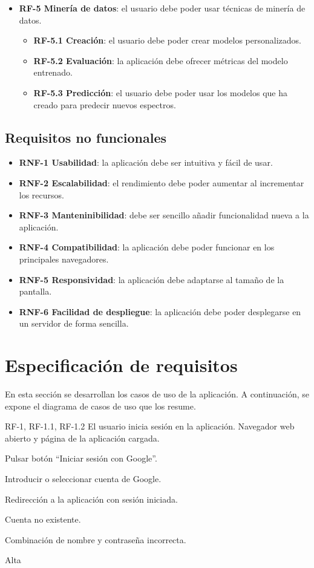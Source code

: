 \begin{itemize}
\begin{itemize}
	\end{itemize}
	\item \textbf{RF-5 Minería de datos}: el usuario debe poder usar técnicas 
	de minería de datos.
	\begin{itemize}
		\item \textbf{RF-5.1 Creación}: el usuario debe poder crear modelos 
		personalizados.
		\item \textbf{RF-5.2 Evaluación}: la aplicación debe ofrecer métricas 
		del modelo entrenado.
		\item \textbf{RF-5.3 Predicción}: el usuario debe poder usar los 
		modelos que ha creado para predecir nuevos espectros.
	\end{itemize}
\end{itemize}

\subsection{Requisitos no funcionales}

	\begin{itemize}
	\item \textbf{RNF-1 Usabilidad}: la aplicación debe ser intuitiva y fácil 
	de usar.
	\item \textbf{RNF-2 Escalabilidad}: el rendimiento debe poder aumentar al 
	incrementar los recursos.
	\item \textbf{RNF-3 Manteninibilidad}: debe ser sencillo añadir 
	funcionalidad nueva a la aplicación.
	\item \textbf{RNF-4 Compatibilidad}: la aplicación debe poder funcionar en 
	los principales navegadores.
	\item \textbf{RNF-5 Responsividad}: la aplicación debe adaptarse al tamaño 
	de la pantalla.
	\item \textbf{RNF-6 Facilidad de despliegue}: la aplicación debe poder 
	desplegarse en un servidor de forma sencilla.
	\end{itemize}

\section{Especificación de requisitos}

En esta sección se desarrollan los casos de uso de la aplicación. A 
continuación, se expone el diagrama de casos de uso que los resume.

{RF-1, RF-1.1, RF-1.2}
{El usuario inicia sesión en la aplicación.}
{Navegador web abierto y página de la aplicación cargada.}
{
	\item Pulsar botón ``Iniciar sesión con Google''.
	\item Introducir o seleccionar cuenta de Google.
}
{Redirección a la aplicación con sesión iniciada.}
{	\item Cuenta no existente.
	\item Combinación de nombre y contraseña incorrecta.
}
{Alta}

